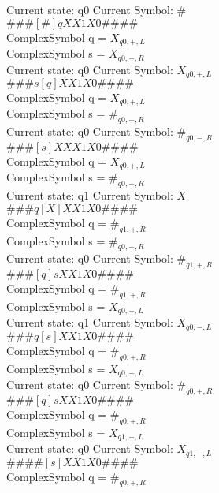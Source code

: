 \documentclass[10pt, a4paper]{article}
\begin{document}
 \medskip
Current state: q0	 Current Symbol: 	 $\#$\\
$\# \#\# [ \# ] q X X 1 X 0 \# \# \# \# $ \\
ComplexSymbol q = $X_{q0,+,L}$ \\
ComplexSymbol s = $X_{q0,-,R}$ \\ 
 \medskip
Current state: q0	 Current Symbol: 	 $X_{q0,+,L}$\\
$\# \#\# s [ q ] X X 1 X 0 \# \# \# \# $ \\
ComplexSymbol q = $X_{q0,+,L}$ \\
ComplexSymbol s = $\#_{q0,-,R}$ \\ 
 \medskip
Current state: q0	 Current Symbol: 	 $\#_{q0,-,R}$\\
$\# \#\# [ s ] X X X 1 X 0 \# \# \# \# $ \\
ComplexSymbol q = $X_{q0,+,L}$ \\
ComplexSymbol s = $\#_{q0,-,R}$ \\ 
 \medskip
Current state: q1	 Current Symbol: 	 $X$\\
$\# \#\# q [ X ] X X 1 X 0 \# \# \# \# $ \\
ComplexSymbol q = $\#_{q1,+,R}$ \\
ComplexSymbol s = $\#_{q0,-,R}$ \\ 
 \medskip
Current state: q0	 Current Symbol: 	 $\#_{q1,+,R}$\\
$\# \#\# [ q ] s X X 1 X 0 \# \# \# \# $ \\
ComplexSymbol q = $\#_{q1,+,R}$ \\
ComplexSymbol s = $X_{q0,-,L}$ \\ 
 \medskip
Current state: q1	 Current Symbol: 	 $X_{q0,-,L}$\\
$\# \#\# q [ s ] X X 1 X 0 \# \# \# \# $ \\
ComplexSymbol q = $\#_{q0,+,R}$ \\
ComplexSymbol s = $X_{q0,-,L}$ \\ 
 \medskip
Current state: q0	 Current Symbol: 	 $\#_{q0,+,R}$\\
$\# \#\# [ q ] s X X 1 X 0 \# \# \# \# $ \\
ComplexSymbol q = $\#_{q0,+,R}$ \\
ComplexSymbol s = $X_{q1,-,L}$ \\ 
 \medskip
Current state: q0	 Current Symbol: 	 $X_{q1,-,L}$\\
$\# \#\# \# [ s ] X X 1 X 0 \# \# \# \# $ \\
ComplexSymbol q = $\#_{q0,+,R}$ \\
\end{document}
